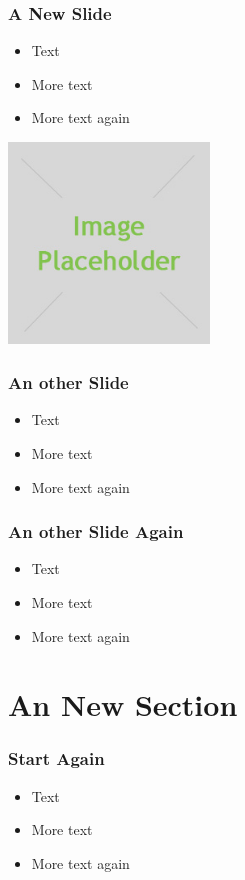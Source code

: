 \begin{frame} 
\frametitle{A New Slide}
\begin{itemize}[<+->]
 \item Text
 \item More text
 \item More text again
\end{itemize}
\begin{center}
  \includegraphics[width=0.4\textwidth]{images/placeholder.jpg}
\end{center}
\end{frame}

\begin{frame} 
\frametitle{An other Slide}
\begin{itemize}[<+->]
 \item Text
 \item More text
 \item More text again
\end{itemize}
\end{frame}

\begin{frame} 
\frametitle{An other Slide Again}
\begin{itemize}[<+->]
 \item Text
 \item More text
 \item More text again
\end{itemize}
\end{frame}

\section{An New Section}
\begin{frame} 
\frametitle{Start Again}
\begin{itemize}[<+->]
 \item Text
 \item More text
 \item More text again
\end{itemize}
\end{frame}

